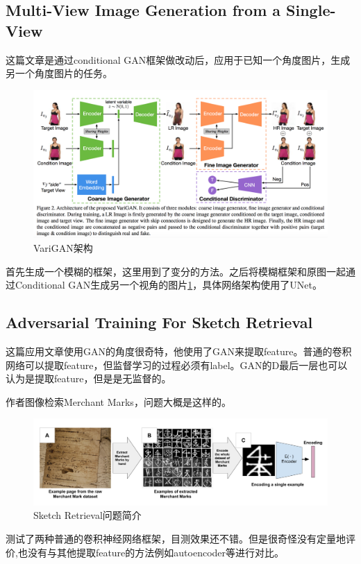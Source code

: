 \documentclass[a4paper]{article}
\begin{document}
\subsection{Multi-View Image Generation from a Single-View\cite{DBLP:journals/corr/ZhaoWCLF17}}
这篇文章是通过conditional GAN框架做改动后，应用于已知一个角度图片，生成另一个角度图片的任务。
\begin{figure}
\centering
\includegraphics[width=\textwidth]{./img/39.png}
\caption{VariGAN架构}
\label{fig:39}
\end{figure}
首先生成一个模糊的框架，这里用到了变分的方法。之后将模糊框架和原图一起通过Conditional GAN生成另一个视角的图片\ref{fig:39}，具体网络架构使用了UNet。

\subsection{Adversarial Training For Sketch Retrieval\cite{DBLP:journals/corr/CreswellB16}}
这篇应用文章使用GAN的角度很奇特，他使用了GAN来提取feature。普通的卷积网络可以提取feature，但监督学习的过程必须有label。GAN的D最后一层也可以认为是提取feature，但是是无监督的。

作者图像检索Merchant Marks，问题大概是这样的。
\begin{figure}
\centering
\includegraphics[width=\textwidth]{./img/22.png}
\caption{Sketch Retrieval问题简介}
\label{fig:22}
\end{figure}测试了两种普通的卷积神经网络框架，目测效果还不错。但是很奇怪没有定量地评价,也没有与其他提取feature的方法例如autoencoder等进行对比。
\end{document}
